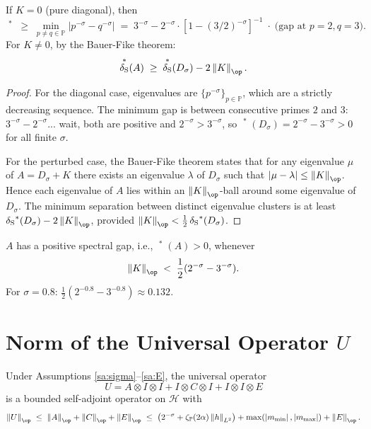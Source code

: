 \documentclass[12pt,letterpaper]{article}
\theoremstyle{definition}
\theoremstyle{remark}
\DeclareMathOperator{\sgap}{\delta_S}
\newcommand{\PP}{\mathbb{P}}
\newcommand{\HH}{\mathcal{H}}
\newcommand{\norm}[1]{\left\|#1\right\|}
\newcommand{\abs}[1]{\left|#1\right|}
\begin{document}
\begin{applemma}[Lower bound on $\sgap^*$ from $D_\sigma$]
\label{lem:sgap-lower}
If $K = 0$ (pure diagonal), then
\[
  \sgap^*
  \;\geq\;
  \min_{p \neq q \in \PP} \abs{p^{-\sigma} - q^{-\sigma}}
  \;=\;
  3^{-\sigma} - 2^{-\sigma} \cdot \left[1 - (3/2)^{-\sigma}\right]^{-1}
  \;\cdot\; \text{(gap at } p=2, q=3\text{)}.
\]
For $K \neq 0$, by the Bauer-Fike theorem:
\[
  \sgap^*(A) \;\geq\; \sgap^*(D_\sigma) - 2\norm{K}_{\op}.
\]
\end{applemma}

\begin{proof}
For the diagonal case, eigenvalues are $\{p^{-\sigma}\}_{p \in \PP}$, which
are a strictly decreasing sequence. The minimum gap is between consecutive
primes $2$ and $3$: $3^{-\sigma} - 2^{-\sigma}$... wait, both are positive
and $2^{-\sigma} > 3^{-\sigma}$, so
$\sgap^*(D_\sigma) = 2^{-\sigma} - 3^{-\sigma} > 0$ for all finite $\sigma$.

For the perturbed case, the Bauer-Fike theorem states that for any eigenvalue
$\mu$ of $A = D_\sigma + K$ there exists an eigenvalue $\lambda$ of
$D_\sigma$ such that $\abs{\mu - \lambda} \leq \norm{K}_{\op}$. Hence
each eigenvalue of $A$ lies within an $\norm{K}_{\op}$-ball around some
eigenvalue of $D_\sigma$. The minimum separation between distinct eigenvalue
clusters is at least $\sgap^*(D_\sigma) - 2\norm{K}_{\op}$, provided
$\norm{K}_{\op} < \tfrac{1}{2}\sgap^*(D_\sigma)$.
\end{proof}

\begin{appcorollary}
\label{cor:nondegen}
$A$ has a positive spectral gap, i.e., $\sgap^*(A) > 0$, whenever
\[
  \norm{K}_{\op}
  \;<\;
  \frac{1}{2}(2^{-\sigma} - 3^{-\sigma}).
\]
For $\sigma = 0.8$: $\tfrac{1}{2}(2^{-0.8} - 3^{-0.8}) \approx 0.132$.
\end{appcorollary}

\section{Norm of the Universal Operator \texorpdfstring{$U$}{U}}
\label{app:U-norm}

\begin{apptheorem}
\label{thm:U-norm}
Under Assumptions \ref{sa:sigma}--\ref{sa:E}, the universal operator
\[
  U = A \otimes I \otimes I + I \otimes C \otimes I + I \otimes I \otimes E
\]
is a bounded self-adjoint operator on $\HH$ with
\[
  \norm{U}_{\op}
  \;\leq\;
  \norm{A}_{\op} + \norm{C}_{\op} + \norm{E}_{\op}
  \;\leq\;
  \left(2^{-\sigma} + \zeta_\PP(2\alpha)\norm{h}_{L^2}\right)
  + \max(\abs{m_{\min}},\abs{m_{\max}})
  + \norm{E}_{\op}.
\]
\end{apptheorem}
\end{document}
